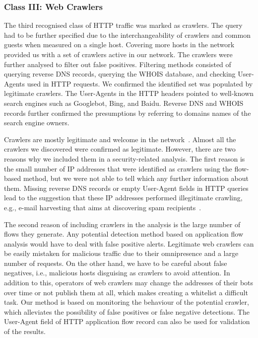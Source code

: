 \subsubsection{Class III: Web Crawlers}

The third recognised class of HTTP traffic was marked as crawlers. The query had to be further specified due to the interchangeability of crawlers and common guests when measured on a single host. Covering more hosts in the network provided us with a set of crawlers active in our network. The crawlers were further analysed to filter out false positives. Filtering methods consisted of querying reverse DNS records, querying the WHOIS database, and checking User-Agents used in HTTP requests. We confirmed the identified set was populated by legitimate crawlers. The User-Agents in the HTTP headers pointed to well-known search engines such as Googlebot, Bing, and Baidu. Reverse DNS and WHOIS records further confirmed the presumptions by referring to domains names of the search engine owners.

Crawlers are mostly legitimate and welcome in the network~\cite{Sun-2010-Ethicality}. Almost all the crawlers we discovered were confirmed as legitimate. However, there are two reasons why we included them in a security-related analysis. The first reason is the small number of IP addresses that were identified as crawlers using the flow-based method, but we were not able to tell which any further information about them. Missing reverse DNS records or empty User-Agent fields in HTTP queries lead to the suggestion that these IP addresses performed illegitimate crawling, e.g., e-mail harvesting that aims at discovering spam recipients~\cite{Hohlfeld-2012-Longtime}.

The second reason of including crawlers in the analysis is the large number of flows they generate. Any potential detection method based on application flow analysis would have to deal with false positive alerts. Legitimate web crawlers can be easily mistaken for malicious traffic due to their omnipresence and a large number of requests. On the other hand, we have to be careful about false negatives, i.e., malicious hosts disguising as crawlers to avoid attention. In addition to this, operators of web crawlers may change the addresses of their bots over time or not publish them at all, which makes creating a whitelist a difficult task. Our method is based on monitoring the behaviour of the potential crawler, which alleviates the possibility of false positives or false negative detections. The User-Agent field of HTTP application flow record can also be used for validation of the results.



